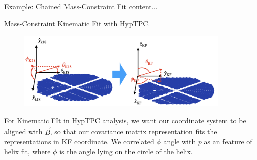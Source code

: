 \documentclass[
	xcolor=dvipsnames,
	aspectratio=169,	
	10pt, 
	]{beamer}
\begin{document}
\begin{frame}{Example: Chained Mass-Constraint Fit}
	content...
\end{frame}
\begin{frame}{Mass-Constraint Kinematic Fit with HypTPC.}
	\begin{block}{}
		\begin{figure}
			\includegraphics[width=0.9\textwidth]{Coords_K18_KF}
		\end{figure}
		For Kinematic FIt in HypTPC analysis, we want our coordinate system to be aligned with $\vec B$, so that our covariance matrix representation fits the representations in KF coordinate. We correlated $\phi$ angle with $p$ as an feature of helix fit, where $\phi$ is the angle lying on the circle of the helix. 
	\end{block}
\end{frame}

\end{document}
